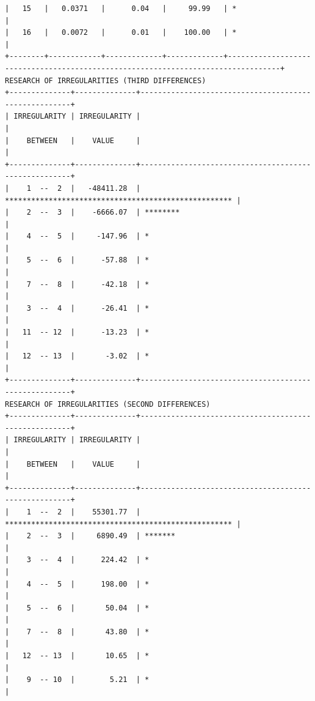 \documentclass[a4paper,10pt,twocolumn]{article}
\begin{document}
\begin{landscape}
\begin{verbatim}
|   15   |   0.0371   |      0.04   |     99.99   | *                                                                                |
|   16   |   0.0072   |      0.01   |    100.00   | *                                                                                |
+--------+------------+-------------+-------------+----------------------------------------------------------------------------------+
RESEARCH OF IRREGULARITIES (THIRD DIFFERENCES)
+--------------+--------------+------------------------------------------------------+
| IRREGULARITY | IRREGULARITY |                                                      |
|    BETWEEN   |    VALUE     |                                                      |
+--------------+--------------+------------------------------------------------------+
|    1  --  2  |   -48411.28  | **************************************************** |
|    2  --  3  |    -6666.07  | ********                                             |
|    4  --  5  |     -147.96  | *                                                    |
|    5  --  6  |      -57.88  | *                                                    |
|    7  --  8  |      -42.18  | *                                                    |
|    3  --  4  |      -26.41  | *                                                    |
|   11  -- 12  |      -13.23  | *                                                    |
|   12  -- 13  |       -3.02  | *                                                    |
+--------------+--------------+------------------------------------------------------+
RESEARCH OF IRREGULARITIES (SECOND DIFFERENCES)
+--------------+--------------+------------------------------------------------------+
| IRREGULARITY | IRREGULARITY |                                                      |
|    BETWEEN   |    VALUE     |                                                      |
+--------------+--------------+------------------------------------------------------+
|    1  --  2  |    55301.77  | **************************************************** |
|    2  --  3  |     6890.49  | *******                                              |
|    3  --  4  |      224.42  | *                                                    |
|    4  --  5  |      198.00  | *                                                    |
|    5  --  6  |       50.04  | *                                                    |
|    7  --  8  |       43.80  | *                                                    |
|   12  -- 13  |       10.65  | *                                                    |
|    9  -- 10  |        5.21  | *                                                    |

\end{verbatim}
\end{landscape}
\end{document}
